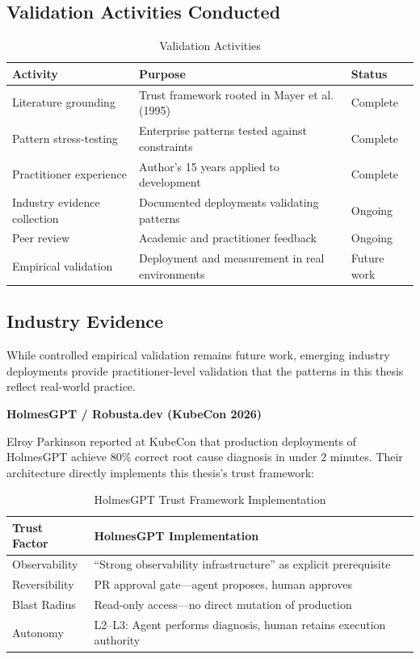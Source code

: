 \subsection{Validation Activities Conducted}
\label{subsec:validation-activities}

\begin{table}[htbp]
\centering
\caption{Validation Activities}
\label{tab:validation-activities}
\begin{tabular}{lll}
\toprule
\textbf{Activity} & \textbf{Purpose} & \textbf{Status} \\
\midrule
Literature grounding & Trust framework rooted in Mayer et al. (1995) & Complete \\
Pattern stress-testing & Enterprise patterns tested against constraints & Complete \\
Practitioner experience & Author's 15 years applied to development & Complete \\
Industry evidence collection & Documented deployments validating patterns & Ongoing \\
Peer review & Academic and practitioner feedback & Ongoing \\
Empirical validation & Deployment and measurement in real environments & Future work \\
\bottomrule
\end{tabular}
\end{table}

\subsection{Industry Evidence}
\label{subsec:industry-evidence}

While controlled empirical validation remains future work, emerging industry deployments provide practitioner-level validation that the patterns in this thesis reflect real-world practice.

\textbf{HolmesGPT / Robusta.dev (KubeCon 2026)}

Elroy Parkinson reported at KubeCon that production deployments of HolmesGPT achieve 80\% correct root cause diagnosis in under 2 minutes. Their architecture directly implements this thesis's trust framework:

\begin{table}[htbp]
\centering
\caption{HolmesGPT Trust Framework Implementation}
\label{tab:holmesgpt-trust}
\begin{tabular}{ll}
\toprule
\textbf{Trust Factor} & \textbf{HolmesGPT Implementation} \\
\midrule
Observability & ``Strong observability infrastructure'' as explicit prerequisite \\
Reversibility & PR approval gate---agent proposes, human approves \\
Blast Radius & Read-only access---no direct mutation of production \\
Autonomy & L2--L3: Agent performs diagnosis, human retains execution authority \\
\bottomrule
\end{tabular}
\end{table}


